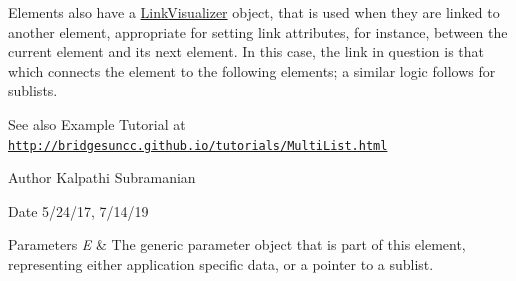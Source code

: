 Elements also have a \hyperlink{classbridges_1_1base_1_1_link_visualizer}{Link\+Visualizer} object, that is used when they are linked to another element, appropriate for setting link attributes, for instance, between the current element and its next element. In this case, the link in question is that which connects the element to the following elements; a similar logic follows for sublists.

\begin{DoxySeeAlso}{See also}
Example Tutorial at \href{http://bridgesuncc.github.io/tutorials/MultiList.html}{\tt http\+://bridgesuncc.\+github.\+io/tutorials/\+Multi\+List.\+html}
\end{DoxySeeAlso}
\begin{DoxyAuthor}{Author}
Kalpathi Subramanian
\end{DoxyAuthor}
\begin{DoxyDate}{Date}
5/24/17, 7/14/19
\end{DoxyDate}

\begin{DoxyParams}{Parameters}
{\em E} & The generic parameter object that is part of this element, representing either application specific data, or a pointer to a sublist. \\
\hline
\end{DoxyParams}
